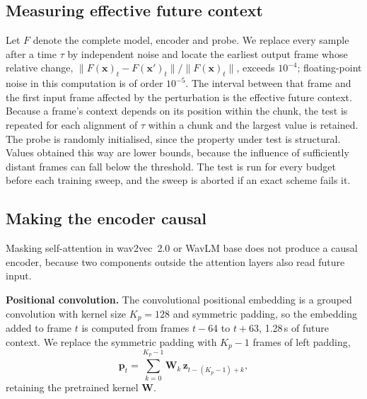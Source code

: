 \documentclass[preprint,12pt,authoryear]{elsarticle}
\begin{document}
\subsection{Measuring effective future context}
\label{sec:reachtest}

Let $F$ denote the complete model, encoder and probe. We replace every sample
after a time $\tau$ by independent noise and locate the earliest output frame
whose relative change, $\lVert F(\mathbf{x})_t - F(\mathbf{x}')_t\rVert /
\lVert F(\mathbf{x})_t\rVert$, exceeds $10^{-4}$; floating-point noise in this
computation is of order $10^{-5}$. The interval between that frame and the
first input frame affected by the perturbation is the effective future
context. Because a frame's context depends on its position within the chunk,
the test is repeated for each alignment of $\tau$ within a chunk and the
largest value is retained. The probe is randomly initialised, since the
property under test is structural. Values obtained this way are lower bounds,
because the influence of sufficiently distant frames can fall below the
threshold. The test is run for every budget before each training sweep, and
the sweep is aborted if an exact scheme fails it.

\subsection{Making the encoder causal}
\label{sec:causal}

Masking self-attention in wav2vec~2.0 or WavLM base \citep{wavlm2022, wav2vec2}
does not produce a causal encoder, because two components outside the
attention layers also read future input.

\textbf{Positional convolution.} The convolutional positional embedding is a
grouped convolution with kernel size $K_p=128$ and symmetric padding, so the
embedding added to frame $t$ is computed from frames $t-64$ to $t+63$, 1.28\,s
of future context. We replace the symmetric padding with $K_p-1$ frames of
left padding,
\begin{equation}
\mathbf{p}_t = \sum_{k=0}^{K_p-1} \mathbf{W}_k\, \mathbf{z}_{t-(K_p-1)+k},
\label{eq:posconv}
\end{equation}
retaining the pretrained kernel $\mathbf{W}$.
\end{document}
